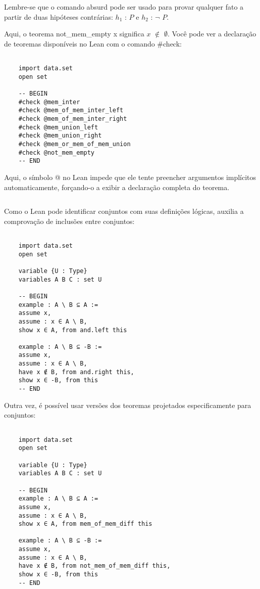 Lembre-se que o comando{
\selectfont absurd} pode ser usado para provar qualquer fato a partir de duas hipóteses contrárias: $h_1$ : $P$ e $h_2$ : $\neg$ $P$. 

Aqui, o teorema {
\selectfont not\_mem\_empty x} significa $x$ $\notin$ $\emptyset$. Você pode ver a declaração de teoremas disponíveis no Lean com o comando{
\selectfont \#check}:
\begin{lstlisting}

    import data.set
    open set

    -- BEGIN
    #check @mem_inter
    #check @mem_of_mem_inter_left
    #check @mem_of_mem_inter_right
    #check @mem_union_left
    #check @mem_union_right
    #check @mem_or_mem_of_mem_union
    #check @not_mem_empty
    -- END

\end{lstlisting}

Aqui, o símbolo{
\selectfont @} no Lean impede que ele tente preencher argumentos implícitos automaticamente, forçando-o a exibir a declaração completa do teorema.

$\qquad$

Como o Lean pode identificar conjuntos com suas definições lógicas, auxilia a comprovação de inclusões entre conjuntos:
\begin{lstlisting}

    import data.set
    open set

    variable {U : Type}
    variables A B C : set U

    -- BEGIN
    example : A \ B ⊆ A :=
    assume x,
    assume : x ∈ A \ B,
    show x ∈ A, from and.left this

    example : A \ B ⊆ -B :=
    assume x,
    assume : x ∈ A \ B,
    have x ∉ B, from and.right this,
    show x ∈ -B, from this
    -- END

\end{lstlisting}

Outra vez, é possível usar versões dos teoremas projetados especificamente para conjuntos:
\begin{lstlisting}

    import data.set
    open set

    variable {U : Type}
    variables A B C : set U

    -- BEGIN
    example : A \ B ⊆ A :=
    assume x,
    assume : x ∈ A \ B,
    show x ∈ A, from mem_of_mem_diff this

    example : A \ B ⊆ -B :=
    assume x,
    assume : x ∈ A \ B,
    have x ∉ B, from not_mem_of_mem_diff this,
    show x ∈ -B, from this
    -- END

\end{lstlisting}


